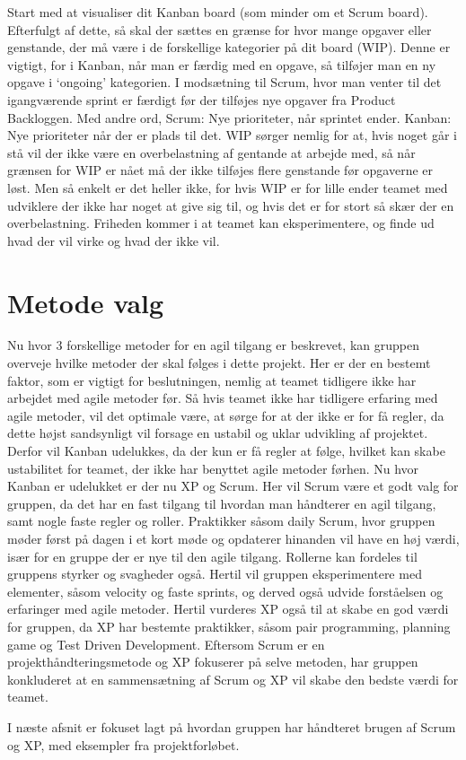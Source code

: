 Start med at visualiser dit Kanban board (som minder om et Scrum board). Efterfulgt af dette, så skal der sættes en grænse for hvor mange opgaver eller genstande, der må være i de forskellige kategorier på dit board (WIP). Denne er vigtigt, for i Kanban, når man er færdig med en opgave, så tilføjer man en ny opgave i ‘ongoing’ kategorien. I modsætning til Scrum, hvor man venter til det igangværende sprint er færdigt før der tilføjes nye opgaver fra Product Backloggen. Med andre ord, Scrum: Nye prioriteter, når sprintet ender. Kanban: Nye prioriteter når der er plads til det.\cite{SlideKanban} WIP sørger nemlig for at, hvis noget går i stå vil der ikke være en overbelastning af gentande at arbejde med, så når grænsen for WIP er nået må der ikke tilføjes flere genstande før opgaverne er løst. Men så enkelt er det heller ikke, for hvis WIP er for lille ender teamet med udviklere der ikke har noget at give sig til, og hvis det er for stort så skær der en overbelastning. Friheden kommer i at teamet kan eksperimentere, og finde ud hvad der vil virke og hvad der ikke vil. 

\section{Metode valg}
Nu hvor 3 forskellige metoder for en agil tilgang er beskrevet, kan gruppen overveje hvilke metoder der skal følges i dette projekt. Her er der en bestemt faktor, som er vigtigt for beslutningen, nemlig at teamet tidligere ikke har arbejdet med agile metoder før. Så hvis teamet ikke har tidligere erfaring med agile metoder, vil det optimale være, at sørge for at der ikke er for få regler, da dette højst sandsynligt vil forsage en ustabil og uklar udvikling af projektet. Derfor vil Kanban udelukkes, da der kun er få regler at følge, hvilket kan skabe ustabilitet for teamet, der ikke har benyttet agile metoder førhen. Nu hvor Kanban er udelukket er der nu XP og Scrum. Her vil Scrum være et godt valg for gruppen, da det har en fast tilgang til hvordan man håndterer en agil tilgang, samt nogle faste regler og roller. Praktikker såsom daily Scrum, hvor gruppen møder først på dagen i et kort møde og opdaterer hinanden vil have en høj værdi, især for en gruppe der er nye til den agile tilgang. Rollerne kan fordeles til gruppens styrker og svagheder også. Hertil vil gruppen eksperimentere med elementer, såsom velocity og faste sprints, og derved også udvide forståelsen og erfaringer med agile metoder. Hertil vurderes XP også til at skabe en god værdi for gruppen, da XP har bestemte praktikker, såsom pair programming, planning game og Test Driven Development. Eftersom Scrum er en projekthåndteringsmetode og XP fokuserer på selve metoden, har gruppen konkluderet at en sammensætning af Scrum og XP vil skabe den bedste værdi for teamet. 

I næste afsnit er fokuset lagt på hvordan gruppen har håndteret brugen af Scrum og XP, med eksempler fra projektforløbet. 


